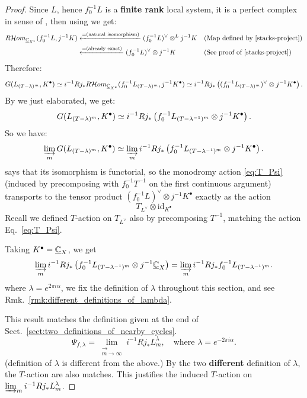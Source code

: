 \begin{proof}
    Since $L$, hence $f^{-1}_0 L$ is a \textbf{finite rank} local system, it is a perfect complex in sense of \cite[\href{https://stacks.math.columbia.edu/tag/08CM}{Tag 08CM}, \href{https://stacks.math.columbia.edu/tag/08C4}{Tag 08C4}]{stacks-project}, then using \cite[\href{https://stacks.math.columbia.edu/tag/08DQ}{Tag 08DQ}]{stacks-project} we get:
    \begin{align*}
        R\hm_{\underline{\C}_{X^*}}(f^{-1}_0 L, j^{-1} K) & \xleftarrow{= \text{(natural isomorphism)}} (f^{-1}_0 L)^{\vee} \otimes^L j^{-1} K &  & \text{(Map defined by \cite[\href{https://stacks.math.columbia.edu/tag/08I1}{Tag 08I1}]{stacks-project})} \\
                                                          & \xleftarrow{= \text{(already exact)}} (f^{-1}_0 L)^{\vee} \otimes j^{-1} K         &  & \text{(See proof of \cite[\href{https://stacks.math.columbia.edu/tag/01E7}{Tag 01E7}]{stacks-project})}
    \end{align*}
    Therefore:
    \[
        G(L_{(T-\lambda)^m}, {K^\bullet}) \simeq i^{-1} Rj_* R\mathcal Hom_{\underline{\mathbb{C}}_{X^*}}(f_{0}^{-1} L_{(T-\lambda)^m}, j^{-1} K^\bullet) \simeq i^{-1} Rj_* \left( (f_{0}^{-1} L_{(T-\lambda)^m})^\vee \otimes j^{-1} K^\bullet \right).
    \]
    By \cite[Lemma~3.8]{Wu2017NearbyVanishingCycles} we just elaborated, we get:
    \[
        G(L_{(T-\lambda)^m}, {K^\bullet}) \simeq i^{-1} Rj_* \left( f_{0}^{-1} L_{(T-\lambda^{-1})^m} \otimes j^{-1} K^\bullet \right).
    \]
    So we have:
    \[
        \varinjlim_{m} G(L_{(T-\lambda)^m}, {K^\bullet}) \simeq \varinjlim_{m} i^{-1} Rj_* \left( f_{0}^{-1} L_{(T-\lambda^{-1})^m} \otimes j^{-1} K^\bullet \right).
    \]
    \cite[\href{https://stacks.math.columbia.edu/tag/08DQ}{Tag 08DQ}]{stacks-project} says that its isomorphism is functorial,
    so the monodromy action \eqref{eq:T_Psi} (induced by precomposing with $f_0^{-1}T^{-1}$ on the first continuous argument) transports to the tensor product $(f^{-1}_0 L)^{\vee} \otimes j^{-1} K^\bullet$ exactly as the action
    \[
        T_{L^\vee} \otimes \mathrm{id}_{K^\bullet}
    \]
    Recall we defined $T$-action on $T_{L^\vee}$ also by precomposing $T^{-1}$, matching the action Eq.~\eqref{eq:T_Psi}.

    Taking $K^\bullet = \underline{\mathbb{C}}_{X}$, we get
    \[
        \varinjlim_{m} i^{-1} Rj_* \left( f_{0}^{-1} L_{(T-\lambda^{-1})^m} \otimes j^{-1} \underline{\mathbb{C}}_{X} \right) = \varinjlim_{m} i^{-1} Rj_* f_{0}^{-1} L_{(T-\lambda^{-1})^m}.
    \]
    where $\lambda = e^{2\pi i \alpha}$, we fix the definition of $\lambda$ throughout this section,
    and see Rmk.~\ref{rmk:different_definitions_of_lambda}.

    This result matches the definition given at the end of Sect.~\ref{sect:two_definitions_of_nearby_cycles}.
    \[
        \Psi_{f,\lambda} = \lim_{\substack{\longrightarrow \\ m \to \infty}} i^{-1} Rj_\ast L_m^{\lambda}, \quad \text{where } \lambda = e^{-2\pi i \alpha}.
    \]
    (definition of $\lambda$ is different from the above.) By the two \textbf{different} definition of $\lambda$, the $T$-action are also matches.
    This justifies the induced $T$-action on $\varinjlim_m i^{-1} Rj_\ast L_m^{\lambda}$.

\end{proof}
